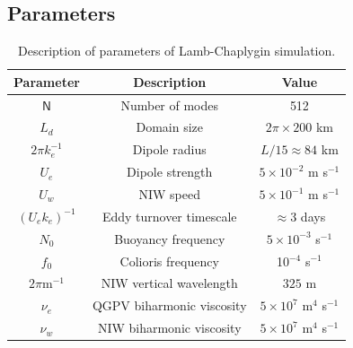 \documentclass{jfm}
\begin{document}
\subsection{Parameters}

\begin{table}
 \begin{center}
   \caption{Description of parameters of Lamb-Chaplygin simulation.}
   \label{parameters_lamb}
   \begin{tabular}{ c | c | c }
     \hline
      Parameter & Description & Value\\
      \hline
      $\mathsf{N}$   & Number of modes &  512 \\
      $L_d$ & Domain size & $2\pi\times 200$ km \\
      $2\pi k_e^{-1}$ & Dipole radius & $L/15 \approx 84$ km \\
      $U_e$ & Dipole strength & $5\times 10^{-2}$ m s$^{-1}$ \\
      $U_w$ & NIW speed & $5\times 10^{-1}$ m s$^{-1}$ \\
      $(U_e k_e)^{-1}$ & Eddy turnover timescale & $\approx 3$ days\\
      $N_0$ & Buoyancy frequency & $5 \times 10^{-3}$ s$^{-1}$\\
      $f_0$ & Colioris frequency & 10$^{-4}$ s$^{-1}$\\
      $2\pi$m$^{-1}$ & NIW vertical wavelength & $325$ m \\
      $\nu_e$ & QGPV biharmonic viscosity & $5\times 10^{7}$ m$^4$ s$^{-1}$\\
      $\nu_w$ & NIW biharmonic viscosity & $ 5 \times 10^{7}$ m$^4$ s$^{-1}$\\
   \end{tabular}
 \end{center}
\end{table}
\end{document}
